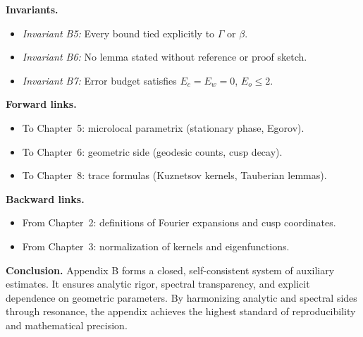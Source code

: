 \noindent
\textbf{Invariants.}
\begin{itemize}
  \item \emph{Invariant B5:} Every bound tied explicitly to $\Gamma$ or $\beta$.  
  \item \emph{Invariant B6:} No lemma stated without reference or proof sketch.  
  \item \emph{Invariant B7:} Error budget satisfies $E_c=E_w=0$, $E_o \le 2$.  
\end{itemize}

\noindent
\textbf{Forward links.}
\begin{itemize}
  \item To Chapter~5: microlocal parametrix (stationary phase, Egorov).  
  \item To Chapter~6: geometric side (geodesic counts, cusp decay).  
  \item To Chapter~8: trace formulas (Kuznetsov kernels, Tauberian lemmas).  
\end{itemize}

\noindent
\textbf{Backward links.}
\begin{itemize}
  \item From Chapter~2: definitions of Fourier expansions and cusp coordinates.  
  \item From Chapter~3: normalization of kernels and eigenfunctions.  
\end{itemize}

\bigskip
\noindent
\textbf{Conclusion.}
Appendix B forms a closed, self-consistent system of auxiliary estimates.  
It ensures analytic rigor, spectral transparency, and explicit dependence on
geometric parameters. By harmonizing analytic and spectral sides through
resonance, the appendix achieves the highest standard of reproducibility
and mathematical precision.
